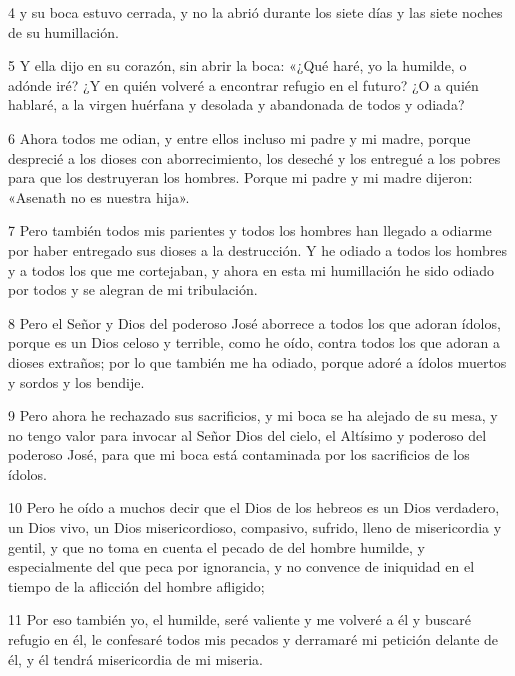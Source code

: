 \par 4 y su boca estuvo cerrada, y no la abrió durante los siete días y las siete noches de su humillación.

\par 5 Y ella dijo en su corazón, sin abrir la boca: «¿Qué haré, yo la humilde, o adónde iré? ¿Y en quién volveré a encontrar refugio en el futuro? ¿O a quién hablaré, a la virgen huérfana y desolada y abandonada de todos y odiada?

\par 6 Ahora todos me odian, y entre ellos incluso mi padre y mi madre, porque desprecié a los dioses con aborrecimiento, los deseché y los entregué a los pobres para que los destruyeran los hombres. Porque mi padre y mi madre dijeron: «Asenath no es nuestra hija».

\par 7 Pero también todos mis parientes y todos los hombres han llegado a odiarme por haber entregado sus dioses a la destrucción. Y he odiado a todos los hombres y a todos los que me cortejaban, y ahora en esta mi humillación he sido odiado por todos y se alegran de mi tribulación.

\par 8 Pero el Señor y Dios del poderoso José aborrece a todos los que adoran ídolos, porque es un Dios celoso y terrible, como he oído, contra todos los que adoran a dioses extraños; por lo que también me ha odiado, porque adoré a ídolos muertos y sordos y los bendije.

\par 9 Pero ahora he rechazado sus sacrificios, y mi boca se ha alejado de su mesa, y no tengo valor para invocar al Señor Dios del cielo, el Altísimo y poderoso del poderoso José, para que mi boca está contaminada por los sacrificios de los ídolos.

\par 10 Pero he oído a muchos decir que el Dios de los hebreos es un Dios verdadero, un Dios vivo, un Dios misericordioso, compasivo, sufrido, lleno de misericordia y gentil, y que no toma en cuenta el pecado de del hombre humilde, y especialmente del que peca por ignorancia, y no convence de iniquidad en el tiempo de la aflicción del hombre afligido;

\par 11 Por eso también yo, el humilde, seré valiente y me volveré a él y buscaré refugio en él, le confesaré todos mis pecados y derramaré mi petición delante de él, y él tendrá misericordia de mi miseria.

